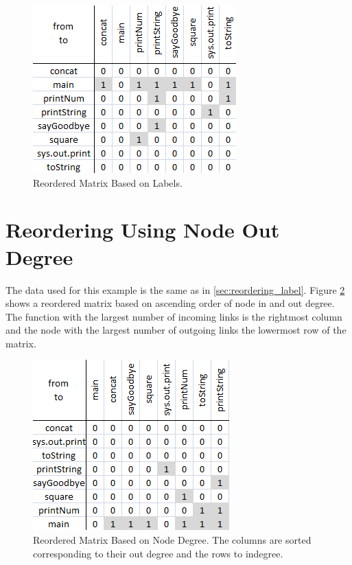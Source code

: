 \begin{figure}[H]
  \centering
  \includegraphics[scale=0.9]{images/Reordering_Example_label.png}
  \caption{Reordered Matrix Based on Labels. \label{fig:reordering_example_label}}
\end{figure}


\section{Reordering Using Node Out Degree}
The data used for this example is the same as in \ref{sec:reordering_label}. Figure \ref{fig:reordering_example_degree} shows a reordered matrix based on ascending order of node in and out degree. The function with the largest number of incoming links is the rightmost column and the node with the largest number of outgoing links the lowermost row of the matrix.

\begin{figure}[H]
  \centering
  \includegraphics[scale=0.9]{images/Reordering_Example_degree.png}
  \caption{Reordered Matrix Based on Node Degree. The columns are sorted corresponding to their out degree and the rows to indegree. \label{fig:reordering_example_degree}}
\end{figure}


